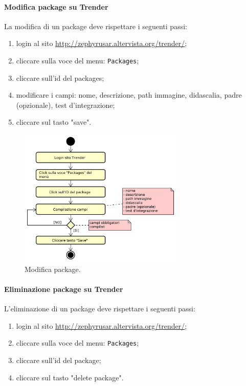 		\paragraph{Modifica package su Trender} \label{sec:traccTint}
		La modifica di un package deve rispettare i seguenti passi:
		\begin{enumerate}
			\item login al sito \url{http://zephyrusar.altervista.org/trender/};
			\item cliccare sulla voce del menu: \texttt{Packages};
			\item cliccare sull'id del packages;	
			\item modificare i campi: nome, descrizione, path immagine, didascalia, padre (opzionale), test d'integrazione;
			\item cliccare sul tasto "save".
		\end{enumerate}
		\begin{figure}[H]
			\centering
			\includegraphics[width=0.7\textwidth]{img/ModificaPack}
			\caption{Modifica package.}
		\end{figure}
	
		\paragraph{Eliminazione package su Trender}				
		L'eliminazione di un package deve rispettare i seguenti passi:
		\begin{enumerate}
			\item login al sito \url{http://zephyrusar.altervista.org/trender/};
			\item cliccare sulla voce del menu: \texttt{Packages};
			\item cliccare sull'id del package;
			\item cliccare sul tasto "delete package".
		\end{enumerate}
		
